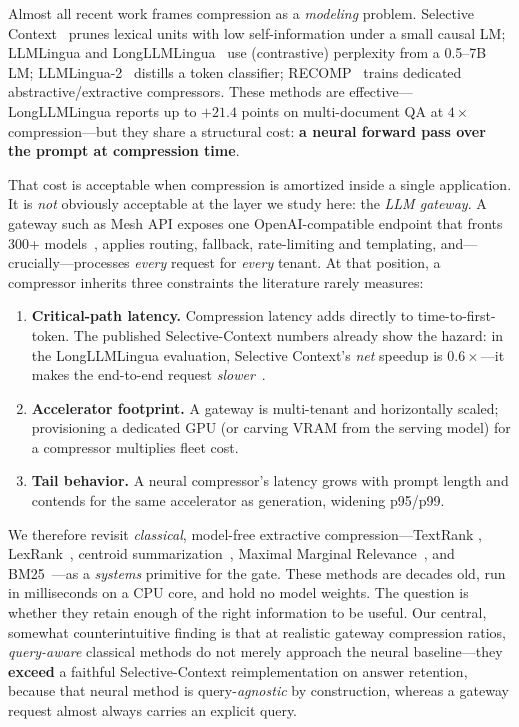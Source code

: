 \documentclass[11pt]{article}
\begin{document}
Almost all recent work frames compression as a \emph{modeling} problem. Selective
Context~\cite{selectivecontext} prunes lexical units with low self-information under a
small causal LM; LLMLingua and LongLLMLingua~\cite{llmlingua,longllmlingua} use
(contrastive) perplexity from a 0.5--7B LM; LLMLingua-2~\cite{llmlingua2} distills a
token classifier; RECOMP~\cite{recomp} trains dedicated abstractive/extractive
compressors. These methods are effective---LongLLMLingua reports up to $+21.4$ points
on multi-document QA at $4\times$ compression---but they share a structural cost:
\textbf{a neural forward pass over the prompt at compression time}.

That cost is acceptable when compression is amortized inside a single application.
It is \emph{not} obviously acceptable at the layer we study here: the \emph{LLM
gateway}. A gateway such as Mesh API exposes one OpenAI-compatible endpoint that
fronts 300+ models~\cite{meshapi}, applies routing, fallback, rate-limiting and
templating, and---crucially---processes \emph{every} request for \emph{every} tenant.
At that position, a compressor inherits three constraints the literature rarely
measures:
\begin{enumerate}[leftmargin=1.4em,itemsep=1pt,topsep=2pt]
  \item \textbf{Critical-path latency.} Compression latency adds directly to
  time-to-first-token. The published Selective-Context numbers already show the
  hazard: in the LongLLMLingua evaluation, Selective Context's \emph{net} speedup is
  $0.6\times$---it makes the end-to-end request \emph{slower}~\cite{longllmlingua}.
  \item \textbf{Accelerator footprint.} A gateway is multi-tenant and horizontally
  scaled; provisioning a dedicated GPU (or carving VRAM from the serving model) for a
  compressor multiplies fleet cost.
  \item \textbf{Tail behavior.} A neural compressor's latency grows with prompt
  length and contends for the same accelerator as generation, widening p95/p99.
\end{enumerate}

We therefore revisit \emph{classical}, model-free extractive compression---TextRank
\cite{textrank}, LexRank~\cite{lexrank}, centroid summarization~\cite{centroid},
Maximal Marginal Relevance~\cite{mmr}, and BM25~\cite{bm25}---as a \emph{systems}
primitive for the gate. These methods are decades old, run in milliseconds on a CPU
core, and hold no model weights. The question is whether they retain enough of the
right information to be useful. Our central, somewhat counterintuitive finding is that
at realistic gateway compression ratios, \emph{query-aware} classical methods do not
merely approach the neural baseline---they \textbf{exceed} a faithful Selective-Context
reimplementation on answer retention, because that neural method is query-\emph{agnostic}
by construction, whereas a gateway request almost always carries an explicit query.
\end{document}
